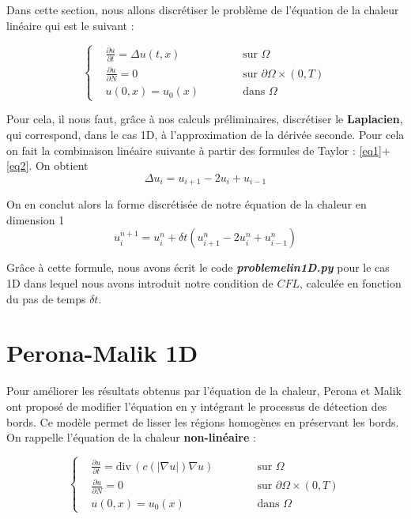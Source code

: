 \documentclass[a4paper,12pt,twoside]{report}
\newcommand{\1}{\mathbb{1}}
\renewcommand{\div}{\mathrm{div}\,}
\begin{document}
	Dans cette section, nous allons discrétiser le problème de l'équation de la chaleur linéaire qui est le suivant : 
	
	\begin{equation}
	\left\{
	\begin{aligned}
	&\frac{\partial u}{\partial t}=\Delta u(t,x) &\qquad &\text{ sur } \Omega \\
	&\frac{\partial u}{\partial N} = 0 &\qquad &\text{ sur } \partial \Omega \times \left(0,T\right) \\
	&u(0,x) = u_0(x) &\qquad &\text{ dans } \Omega
	\end{aligned}
	\right.
	\end{equation}
	
	Pour cela, il nous faut, grâce à nos calculs préliminaires, discrétiser le \textbf{Laplacien}, qui correspond, dans le cas 1D, à l'approximation de la dérivée seconde. Pour cela on fait la combinaison linéaire suivante à partir des formules de Taylor : \ref{eq1}+\ref{eq2}. On obtient 
	\[
	\Delta u_i = u_{i+1}-2u_{i}+u_{i-1}
	\]
	
	On en conclut alors la forme discrétisée de notre équation de la chaleur en dimension 1 
	\[
	u^{n+1}_{i} = u^{n}_{i} + \delta t(u^{n}_{i+1}-2u^{n}_{i}+u^{n}_{i-1})
	\]
	
	Grâce à cette formule, nous avons écrit le code \emph{\textbf{problemelin1D.py}} pour le cas 1D dans lequel nous avons introduit notre condition de $CFL$, calculée en fonction du pas de temps $\delta t$.
	
	
	
	\section*{Perona-Malik 1D}
	
	Pour améliorer les résultats obtenus par l'équation de la chaleur, Perona et Malik ont proposé de modifier l'équation en y intégrant le processus de détection des bords. Ce modèle permet de lisser les régions homogènes en préservant les bords. On rappelle l'équation de la chaleur \textbf{non-linéaire} :
	
\begin{equation*}
\left\{
\begin{aligned}
&\frac{\partial u}{\partial t} = \div\left(c\left(\left|\nabla u\right|\right)\nabla u\right) &\qquad &\text{ sur } \Omega \\
&\frac{\partial u}{\partial N} = 0 &\qquad &\text{ sur } \partial \Omega \times \left(0,T\right) \\
&u(0,x) = u_0(x) &\qquad &\text{ dans } \Omega 
\end{aligned}
\right.
\end{equation*}
\end{document}
